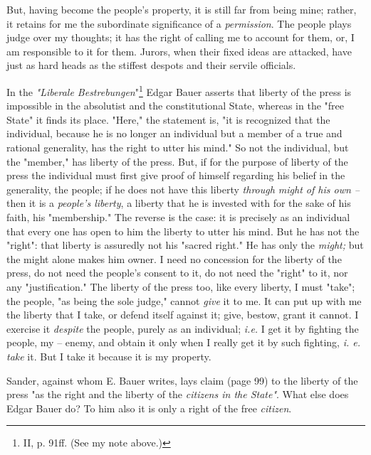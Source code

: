 But, having become the people's property, it is still far from being mine; 
rather, it retains for me the subordinate significance of a 
\textit{permission}. The people plays judge over my thoughts; it has the right 
of calling me to account for them, or, I am responsible to it for them. 
Jurors, when their fixed ideas are attacked, have just as hard heads as the 
stiffest despots and their servile officials.

In the \textit{"{}Liberale Bestrebungen}"{}\footnote{II, p. 91ff. (See my note 
above.)} Edgar Bauer asserts that liberty of the press is impossible in the 
absolutist and the constitutional State, whereas in the "{}free State"{} it 
finds its place. "{}Here,"{} the statement is, "{}it is recognized that the 
individual, because he is no longer an individual but a member of a true and 
rational generality, has the right to utter his mind."{} So not the 
individual, but the "{}member,"{} has liberty of the press. But, if for the 
purpose of liberty of the press the individual must first give proof of 
himself regarding his belief in the generality, the people; if he does not 
have this liberty \textit{through might of his own --} then it is a 
\textit{people's liberty}, a liberty that he is invested with for the sake of 
his faith, his "{}membership."{} The reverse is the case: it is precisely as 
an individual that every one has open to him the liberty to utter his mind. 
But he has not the "{}right"{}: that liberty is assuredly not his "{}sacred 
right."{} He has only the \textit{might;} but the might alone makes him owner. 
I need no concession for the liberty of the press, do not need the people's 
consent to it, do not need the "{}right"{} to it, nor any "{}justification."{} 
The liberty of the press too, like every liberty, I must "{}take"{}; the 
people, "{}as being the sole judge,"{} cannot \textit{give} it to me. It can 
put up with me the liberty that I take, or defend itself against it; give, 
bestow, grant it cannot. I exercise it \textit{despite} the people, purely as 
an individual; \textit{i.e.} I get it by fighting the people, my -- enemy, and 
obtain it only when I really get it by such fighting, \textit{i. e. take} it. 
But I take it because it is my property.

Sander, against whom E. Bauer writes, lays claim (page 99) to the liberty of 
the press "{}as the right and the liberty of the \textit{citizens in the 
State"{}}. What else does Edgar Bauer do? To him also it is only a right of 
the free \textit{citizen}.

